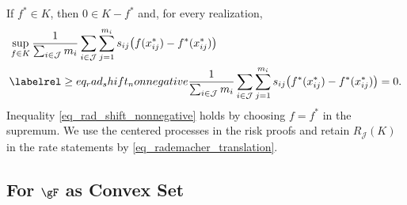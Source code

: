 \documentclass[twoside,11pt]{article}
\newenvironment{revision}{\color{revisionred}}{}
\begin{document}
\begin{revision}
If $f^*\in K$, then $0\in K-f^*$ and, for every realization,
\begin{align*}
&\sup_{f\in K}
\frac{1}{\sum_{i\in\mathcal J}m_i}
\sum_{i\in\mathcal J}\sum_{j=1}^{m_i}
s_{ij}\bigl(f(x_{ij}^*)-f^*(x_{ij}^*)\bigr)\\
&\labelrel \ge {eq_rad_shift_nonnegative}
\frac{1}{\sum_{i\in\mathcal J}m_i}
\sum_{i\in\mathcal J}\sum_{j=1}^{m_i}
s_{ij}\bigl(f^*(x_{ij}^*)-f^*(x_{ij}^*)\bigr)
=0.
\end{align*}
Inequality \eqref{eq_rad_shift_nonnegative} holds by choosing
$f=f^*$ in the supremum.
We use the centered processes in the risk proofs and retain
$R_{\mathcal J}(K)$ in the rate statements by
\eqref{eq_rademacher_translation}.
\end{revision}


\subsection{For $\gF$ as Convex Set}
\end{document}
